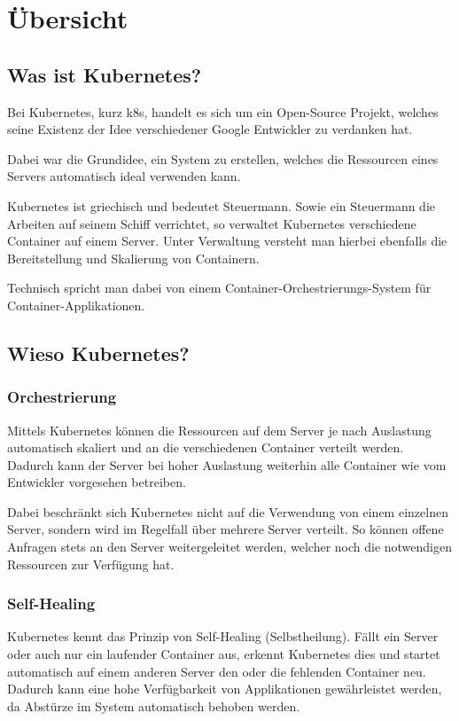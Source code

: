 \section{Übersicht}
\subsection{Was ist Kubernetes?}
Bei Kubernetes, kurz k8s, handelt es sich um ein Open-Source Projekt, welches seine Existenz der Idee verschiedener Google Entwickler zu verdanken hat.

Dabei war die Grundidee, ein System zu erstellen, welches die Ressourcen eines Servers automatisch ideal verwenden kann.\cite{redhat:kubernetes}

Kubernetes ist griechisch und bedeutet Steuermann. Sowie ein Steuermann die Arbeiten auf seinem Schiff verrichtet, so verwaltet Kubernetes verschiedene Container auf einem Server. Unter Verwaltung versteht man hierbei ebenfalls die Bereitstellung und Skalierung von Containern. \cite{syseleven:kubernetes}

Technisch spricht man dabei von einem Container-Orchestrierungs-System für Container-Applikationen.

\subsection{Wieso Kubernetes?}
\subsubsection{Orchestrierung}
Mittels Kubernetes können die Ressourcen auf dem Server je nach Auslastung automatisch skaliert und an die verschiedenen Container verteilt werden. Dadurch kann der Server bei hoher Auslastung weiterhin alle Container wie vom Entwickler vorgesehen betreiben.

Dabei beschränkt sich Kubernetes nicht auf die Verwendung von einem einzelnen Server, sondern wird im Regelfall über mehrere Server verteilt. So können offene Anfragen stets an den Server weitergeleitet werden, welcher noch die notwendigen Ressourcen zur Verfügung hat.

\subsubsection{Self-Healing}
Kubernetes kennt das Prinzip von Self-Healing (Selbstheilung). Fällt ein Server oder auch nur ein laufender Container aus, erkennt Kubernetes dies und startet automatisch auf einem anderen Server den oder die fehlenden Container neu. Dadurch kann eine hohe Verfügbarkeit von Applikationen gewährleistet werden, da Abstürze im System automatisch behoben werden.

